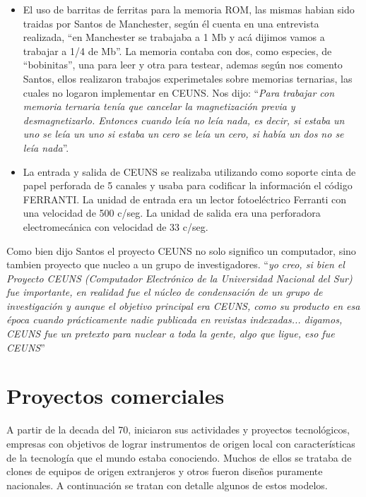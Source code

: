 \documentclass[%
 	final,
%
	notitlepage,
	narroweqnarray,
	inline,
 	twoside,
	]{ieee}
\begin{document}
\begin{itemize}
\item El uso de barritas de ferritas para la memoria ROM, las mismas habian sido traidas por Santos de Manchester, seg\'un \'el cuenta en una entrevista realizada, ``en Manchester se trabajaba a 1 Mb y ac\'a dijimos vamos a trabajar a 1/4 de Mb''. La memoria contaba con dos, como especies, de ``bobinitas'', una para leer y otra para testear, ademas seg\'un nos comento Santos, ellos realizaron trabajos experimetales sobre memorias ternarias, las cuales no logaron implementar en CEUNS. Nos dijo: ``\textit{Para trabajar con memoria ternaria ten\'ia que cancelar la magnetizaci\'on previa y desmagnetizarlo. Entonces cuando le\'ia no le\'ia nada, es decir, si estaba un uno se le\'ia un uno si estaba un cero se le\'ia un cero, si hab\'ia un dos no se le\'ia nada}''.
\item La entrada y salida de CEUNS se realizaba utilizando como soporte cinta de papel perforada de 5 canales y usaba para codificar la informaci\'on el c\'odigo FERRANTI. La unidad de entrada era un lector fotoel\'ectrico Ferranti con una velocidad de 500 c/seg. La unidad de salida era una perforadora electromec\'anica con velocidad de 33 c/seg.
\end{itemize}

Como bien dijo Santos el proyecto CEUNS no solo significo un computador, sino tambien proyecto que nucleo a un grupo de investigadores.
``\textit{yo creo, si bien el Proyecto CEUNS (Computador Electr\'onico de la Universidad Nacional del Sur) fue importante, en realidad fue el n\'ucleo de condensaci\'on de un grupo de investigaci\'on y aunque el objetivo principal era CEUNS, como su producto en esa \'epoca cuando pr\'acticamente nadie publicada en revistas indexadas... digamos, CEUNS fue un pretexto para nuclear a toda la gente, algo que ligue, eso fue CEUNS}''

\section{Proyectos comerciales}
A partir de la decada del 70, iniciaron sus actividades y proyectos tecnol\'ogicos, empresas con objetivos de lograr instrumentos de origen local con caracter\'isticas de la tecnolog\'ia que el mundo estaba conociendo. Muchos de ellos se trataba de clones de equipos de origen extranjeros y otros fueron dise\~nos puramente nacionales.
A continuaci\'on se tratan con detalle algunos de estos modelos.
\end{document}
